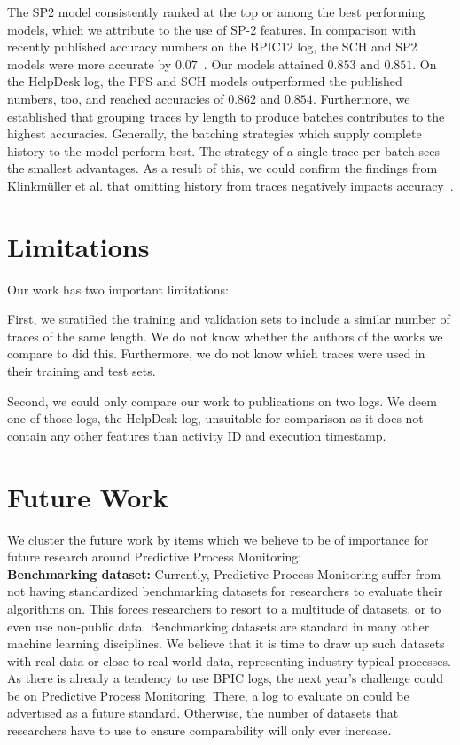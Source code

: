The SP2 model consistently ranked at the top or among the best performing models, which we attribute to the use of SP-2 features. In comparison with recently published accuracy numbers on the BPIC12 log, the SCH and SP2 models were more accurate by $0.07$~\cite{boehmer2018probability, evermann2016}.
Our models attained $0.853$ and $0.851$.
On the HelpDesk log, the PFS and SCH models outperformed the published numbers, too, and reached accuracies of $0.862$ and $0.854$.
Furthermore, we established that grouping traces by length to produce batches contributes to the highest accuracies.
Generally, the batching strategies which supply complete history to the model perform best.
The strategy of a single trace per batch sees the smallest advantages.
As a result of this, we could confirm the findings from Klinkmüller et al. that omitting history from traces negatively impacts accuracy~\cite{klinkmuller2018reliablemonitoring}.

\section{Limitations}\label{sec:conclusion:limitations}
Our work has two important limitations:

First, we stratified the training and validation sets to include a similar number of traces of the same length.
We do not know whether the authors of the works we compare to did this.
Furthermore, we do not know which traces were used in their training and test sets.

Second, we could only compare our work to publications on two logs.
We deem one of those logs, the HelpDesk log, unsuitable for comparison as it does not contain any other features than activity ID and execution timestamp.

\section{Future Work}\label{sec:conclusion:future-work}
We cluster the future work by items which we believe to be of importance for future research around Predictive Process Monitoring:\\

\noindent\textbf{Benchmarking dataset:} Currently, Predictive Process Monitoring suffer from not having standardized benchmarking datasets for researchers to evaluate their algorithms on.
This forces researchers to resort to a multitude of datasets, or to even use non-public data.
Benchmarking datasets are standard in many other machine learning disciplines.
We believe that it is time to draw up such datasets with real data or close to real-world data, representing industry-typical processes.
As there is already a tendency to use BPIC logs, the next year's challenge could be on Predictive Process Monitoring.
There, a log to evaluate on could be advertised as a future standard.
Otherwise, the number of datasets that researchers have to use to ensure comparability will only ever increase.\\

